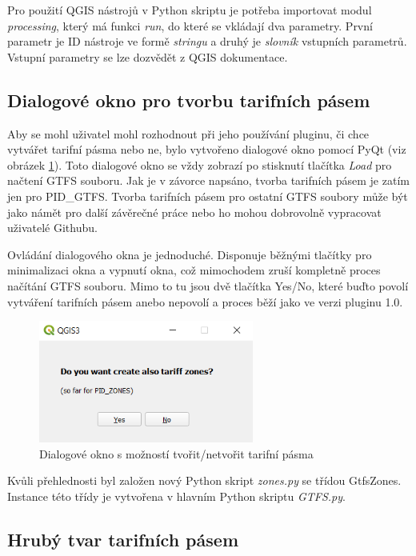 Pro použití QGIS nástrojů v Python skriptu je potřeba importovat modul \textit{processing},
který má funkci \textit{run}, do které se vkládají dva parametry. První parametr je ID nástroje
ve formě \textit{stringu} a druhý je \textit{slovník} vstupních parametrů. Vstupní parametry se lze dozvědět
z QGIS dokumentace. \cite{QGIS_docs}

\subsection{Dialogové okno pro tvorbu tarifních pásem}

Aby se mohl uživatel mohl rozhodnout při jeho používání pluginu, či chce vytvářet tarifní pásma nebo ne, bylo vytvořeno
dialogové okno pomocí PyQt (viz obrázek \ref{fig:dialog}). Toto dialogové okno se vždy zobrazí po stisknutí tlačítka
\textit{Load} pro načtení GTFS souboru. Jak je v závorce napsáno, tvorba tarifních pásem je zatím jen pro PID\_GTFS.
Tvorba tarifních pásem pro ostatní GTFS soubory může být jako námět pro další závěrečné práce nebo ho mohou dobrovolně
vypracovat uživatelé Githubu.

Ovládání dialogového okna je jednoduché. Disponuje běžnými tlačítky pro minimalizaci okna a vypnutí okna, což mimochodem
zruší kompletně proces načítání GTFS souboru. Mimo to tu jsou dvě tlačítka Yes/No, které buďto povolí vytváření tarifních
pásem anebo nepovolí a proces běží jako ve verzi pluginu 1.0.

\begin{figure}[H] \centering
    \includegraphics[width=200pt]{./pictures/dialog.png}
    \caption[Dialogové okno s možností tvořit/netvořit tarifní pásma]{Dialogové okno s možností tvořit/netvořit tarifní pásma}
	\label{fig:dialog}                                
\end{figure}

Kvůli přehlednosti byl založen nový Python skript \textit{zones.py} se třídou GtfsZones. Instance této třídy je vytvořena
v hlavním Python skriptu \textit{GTFS.py}.

\subsection{Hrubý tvar tarifních pásem}

